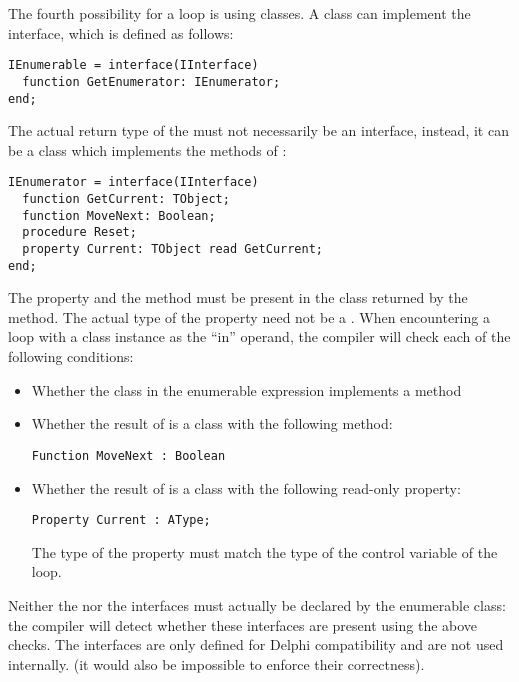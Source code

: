 The fourth possibility for a  loop is using classes. A class can implement the
 interface, which is defined as
follows:
\begin{verbatim}
IEnumerable = interface(IInterface)
  function GetEnumerator: IEnumerator;
end;
\end{verbatim}
The actual return type of the  must not necessarily be an
 interface, instead, it can be a class which implements the methods
of :
\begin{verbatim}
IEnumerator = interface(IInterface)
  function GetCurrent: TObject;
  function MoveNext: Boolean;
  procedure Reset;
  property Current: TObject read GetCurrent;
end;
\end{verbatim}
The  property and the  method must be present in
the class returned by the  method. The actual type of the
 property need not be a . When encountering a
 loop with a class instance as the ``in'' operand, the compiler will
check each of the following conditions:
\begin{itemize}
\item Whether the class in the enumerable expression implements a method
\item Whether the result of  is a class with the
following method:
\begin{verbatim}
Function MoveNext : Boolean
\end{verbatim}
\item Whether the result of  is a class with the
following read-only property:
\begin{verbatim}
Property Current : AType;
\end{verbatim}
The type of the property must match the type of the control variable of the
 loop.
\end{itemize}
Neither the  nor the  interfaces must
actually be declared by the enumerable class: the compiler will detect
whether these interfaces are present using the above checks. The interfaces
are only defined for Delphi compatibility and are not used internally.
(it would also be impossible to enforce their correctness).

